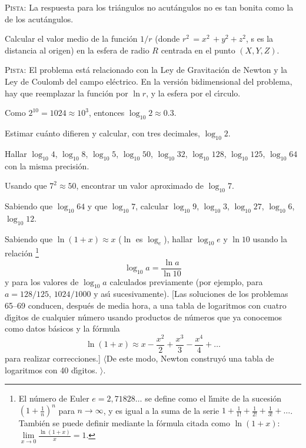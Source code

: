 \documentclass[12pt]{article}  %
\begin{document}
\textsc{Pista:} La respuesta para los tri\'angulos no acut\'angulos no es tan bonita como la de los acut\'angulos.


\bigskip
{} Calcular el valor medio de la funci\'on $1/r$ (donde
$r^2\,=x^2\,+y^2+z^2$, 
\newline
s es la distancia al origen) en la esfera de radio 
$R$ centrada en el punto $(X,Y,Z)$.

\medskip
\textsc{Pista:} El problema est\'a relacionado con la Ley de Gravitaci\'on de Newton y la Ley de Coulomb del campo el\'ectrico.
En la versi\'on bidimensional del problema, hay que reemplazar la funci\'on por $\ln r$, y la esfera por el c\'{\i}rculo.


\bigskip
{} Como $2^{10}=1024 \approx 10^3$, entonces
$\log_{10} 2 \approx 0{.}3$.

Estimar cu\'anto difieren y calcular, con tres decimales, $\log_{10} 2$. 

\bigskip
{} Hallar $\log_{10} 4$, $\log_{10} 8$,
$\log_{10} 5$, $\log_{10} 50$, $\log_{10} 32$, $\log_{10} 128$,
$\log_{10} 125$, $\log_{10} 64$ con la misma precisi\'on.

\bigskip
{} Usando que $7^2 \approx 50$, encontrar un valor aproximado de $\log_{10} 7$.

\bigskip
{} Sabiendo que $\log_{10} 64$ y que $\log_{10} 7$, calcular $\log_{10} 9$, $\log_{10} 3$,
    $\log_{10} 27$, $\log_{10} 6$, $\log_{10} 12$.

\bigskip
{} Sabiendo que $\ln (1+x) \approx x$ ($\ln$ es $\log_e$), hallar $\log_{10} e$ y
    $\ln 10$ usando la relaci\'on \footnote{
El n\'umero de Euler $e = 2{,}71828\dots$ se define como el l\'{\i}mite de la sucesi\'on
  $\left(1+\frac1n\right)^n$ para $n\to \infty$, y es igual a la suma de la serie  
$1+\frac 1{1!} +\frac 1{2!}+\frac 1{3!}+\dots$. Tambi\'en se puede definir mediante la f\'ormula citada como
 $\ln (1+x)$: $\lim\limits_{x\to 0}\frac{\ln(1+x)}{x} = 1$.}\vspace{-\jot}
%
$$
\log_{10} a=\frac{\ln a}{\ln 10}
$$ 
y para los valores de $\log_{10} a$ calculados previamente (por ejemplo, para $a=128/125$, $1024/1000$
y as\'{\i} sucesivamente).
\newpage
[Las soluciones de los problemas 65--69 conducen, despu\'es de media hora, a una tabla de logaritmos con cuatro d\'{\i}gitos de cualquier n\'umero usando productos de n\'umeros que ya conocemos como datos b\'asicos y la f\'ormula  
\vspace{-2\jot}
\[
\ln (1+x) \approx x-\frac{x^2}{2}+\frac{x^3}{3}-\frac{x^4}{4}+\dots
\]
para realizar correcciones.] $\langle$De este modo, Newton construy\'o una tabla de logaritmos con 40 d\'{\i}gitos.%
$\rangle$.
\end{document}
